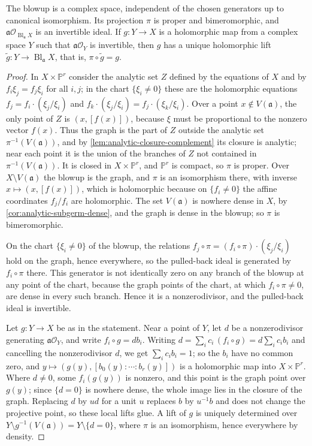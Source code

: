 \begin{proposition}\label{prop:analytic-blowup-universal}
The blowup is a complex space, independent of the chosen generators up to canonical isomorphism. Its projection $\pi$ is proper and bimeromorphic, and $\mathfrak a\mathcal O_{\operatorname{Bl}_{\mathfrak a}X}$ is an invertible ideal. If $g\colon Y\to X$ is a holomorphic map from a complex space $Y$ such that $\mathfrak a\mathcal O_Y$ is invertible, then $g$ has a unique holomorphic lift $\widetilde g\colon Y\to\operatorname{Bl}_{\mathfrak a}X$, that is, $\pi\circ\widetilde g=g$.
\end{proposition}
\begin{proof}
In $X\times\mathbb P^r$ consider the analytic set $Z$ defined by the equations of $X$ and by $f_i\xi_j=f_j\xi_i$ for all $i,j$; in the chart $\{\xi_i\neq0\}$ these are the holomorphic equations $f_j=f_i\cdot(\xi_j/\xi_i)$ and $f_k\cdot(\xi_j/\xi_i)=f_j\cdot(\xi_k/\xi_i)$. Over a point $x\notin V(\mathfrak a)$, the only point of $Z$ is $(x,[f(x)])$, because $\xi$ must be proportional to the nonzero vector $f(x)$. Thus the graph is the part of $Z$ outside the analytic set $\pi^{-1}(V(\mathfrak a))$, and by \cref{lem:analytic-closure-complement} its closure is analytic; near each point it is the union of the branches of $Z$ not contained in $\pi^{-1}(V(\mathfrak a))$. It is closed in $X\times\mathbb P^r$, and $\mathbb P^r$ is compact, so $\pi$ is proper. Over $X\setminus V(\mathfrak a)$ the blowup is the graph, and $\pi$ is an isomorphism there, with inverse $x\mapsto(x,[f(x)])$, which is holomorphic because on $\{f_i\neq0\}$ the affine coordinates $f_j/f_i$ are holomorphic. The set $V(\mathfrak a)$ is nowhere dense in $X$, by \cref{cor:analytic-subgerm-dense}, and the graph is dense in the blowup; so $\pi$ is bimeromorphic.

On the chart $\{\xi_i\neq0\}$ of the blowup, the relations $f_j\circ\pi=(f_i\circ\pi)\cdot(\xi_j/\xi_i)$ hold on the graph, hence everywhere, so the pulled-back ideal is generated by $f_i\circ\pi$ there. This generator is not identically zero on any branch of the blowup at any point of the chart, because the graph points of the chart, at which $f_i\circ\pi\neq0$, are dense in every such branch. Hence it is a nonzerodivisor, and the pulled-back ideal is invertible.

Let $g\colon Y\to X$ be as in the statement. Near a point of $Y$, let $d$ be a nonzerodivisor generating $\mathfrak a\mathcal O_Y$, and write $f_i\circ g=db_i$. Writing $d=\sum_ic_i\,(f_i\circ g)=d\sum_ic_ib_i$ and cancelling the nonzerodivisor $d$, we get $\sum_ic_ib_i=1$; so the $b_i$ have no common zero, and $y\mapsto(g(y),[b_0(y):\cdots:b_r(y)])$ is a holomorphic map into $X\times\mathbb P^r$. Where $d\neq0$, some $f_i(g(y))$ is nonzero, and this point is the graph point over $g(y)$; since $\{d=0\}$ is nowhere dense, the whole image lies in the closure of the graph. Replacing $d$ by $ud$ for a unit $u$ replaces $b$ by $u^{-1}b$ and does not change the projective point, so these local lifts glue. A lift of $g$ is uniquely determined over $Y\setminus g^{-1}(V(\mathfrak a))=Y\setminus\{d=0\}$, where $\pi$ is an isomorphism, hence everywhere by density.


\end{proof}
